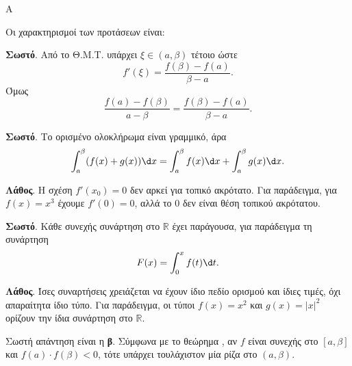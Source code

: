 \begin{thema}{Α}
\begin{erwthma}
\item {}

\item {}

\item {}

\item Οι χαρακτηρισμοί των προτάσεων είναι:
\begin{alist}
\item \textbf{Σωστό}. Από το Θ.Μ.Τ. υπάρχει $\xi\in(a,\beta)$ τέτοιο ώστε
\[ f'(\xi)=\dfrac{f(\beta)-f(a)}{\beta-a}. \]
Όμως
\[ \dfrac{f(a)-f(\beta)}{a-\beta}=\dfrac{f(\beta)-f(a)}{\beta-a}. \]
\item \textbf{Σωστό}. Το ορισμένο ολοκλήρωμα είναι γραμμικό, άρα
\[ \dint_a^\beta (f(x)+g(x))\d x=\dint_a^\beta f(x)\d x+\dint_a^\beta g(x)\d x. \]
\item \textbf{Λάθος}. Η σχέση $f'(x_0)=0$ δεν αρκεί για τοπικό ακρότατο. Για παράδειγμα, για $f(x)=x^3$ έχουμε $f'(0)=0$, αλλά το $0$ δεν είναι θέση τοπικού ακρότατου.
\item \textbf{Σωστό}. Κάθε συνεχής συνάρτηση στο $\mathbb{R}$ έχει παράγουσα, για παράδειγμα τη συνάρτηση
\[ F(x)=\dint_0^x f(t)\d t. \]
\item \textbf{Λάθος}. Ίσες συναρτήσεις χρειάζεται να έχουν ίδιο πεδίο ορισμού και ίδιες τιμές, όχι απαραίτητα ίδιο τύπο. Για παράδειγμα, οι τύποι $f(x)=x^2$ και $g(x)=|x|^2$ ορίζουν την ίδια συνάρτηση στο $\mathbb{R}$.
\end{alist}

\item Σωστή απάντηση είναι η \textbf{β}. Σύμφωνα με το θεώρημα , αν $f$ είναι συνεχής στο $[a,\beta]$ και $f(a)\cdot f(\beta)<0$, τότε υπάρχει τουλάχιστον μία ρίζα στο $(a,\beta)$.
\end{erwthma}
\end{thema}

